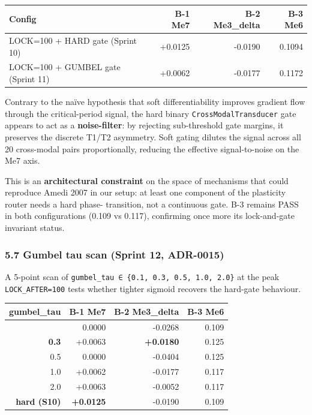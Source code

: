 \documentclass[
]{article}
\newcounter{none} %
\begin{document}
{\def\LTcaptype{none} %
\begin{longtable}[]{@{}lrrr@{}}
\toprule\noalign{}
Config & B-1 Me7 & B-2 Me3\_delta & B-3 Me6 \\
\midrule\noalign{}
\endhead
\bottomrule\noalign{}
\endlastfoot
LOCK=100 + HARD gate (Sprint 10) & +0.0125 & -0.0190 & 0.1094 \\
LOCK=100 + GUMBEL gate (Sprint 11) & +0.0062 & -0.0177 & 0.1172 \\
\end{longtable}
}

Contrary to the naïve hypothesis that soft differentiability improves
gradient flow through the critical-period signal, the hard binary
\texttt{CrossModalTransducer} gate appears to act as a
\textbf{noise-filter}: by rejecting sub-threshold gate margins, it
preserves the discrete T1/T2 asymmetry. Soft gating dilutes the signal
across all 20 cross-modal pairs proportionally, reducing the effective
signal-to-noise on the Me7 axis.

This is an \textbf{architectural constraint} on the space of mechanisms
that could reproduce Amedi 2007 in our setup: at least one component of
the plasticity router needs a hard phase- transition, not a continuous
gate. B-3 remains PASS in both configurations (0.109 vs 0.117),
confirming once more its lock-and-gate invariant status.

\subsubsection{5.7 Gumbel tau scan (Sprint 12,
ADR-0015)}\label{57-gumbel-tau-scan-sprint-12-adr-0015}

A 5-point scan of
\texttt{gumbel\_tau\ ∈\ \{0.1,\ 0.3,\ 0.5,\ 1.0,\ 2.0\}} at the peak
\texttt{LOCK\_AFTER=100} tests whether tighter sigmoid recovers the
hard-gate behaviour.

{\def\LTcaptype{none} %
\begin{longtable}[]{@{}rrrr@{}}
\toprule\noalign{}
gumbel\_tau & B-1 Me7 & B-2 Me3\_delta & B-3 Me6 \\
\midrule\noalign{}
\endhead
\bottomrule\noalign{}
\endlastfoot
0.1 & 0.0000 & -0.0268 & 0.109 \\
\textbf{0.3} & +0.0063 & \textbf{+0.0180} & 0.125 \\
0.5 & 0.0000 & -0.0404 & 0.125 \\
1.0 & +0.0062 & -0.0177 & 0.117 \\
2.0 & +0.0063 & -0.0052 & 0.117 \\
\textbf{hard (S10)} & \textbf{+0.0125} & -0.0190 & 0.109 \\
\end{longtable}
}
\end{document}
